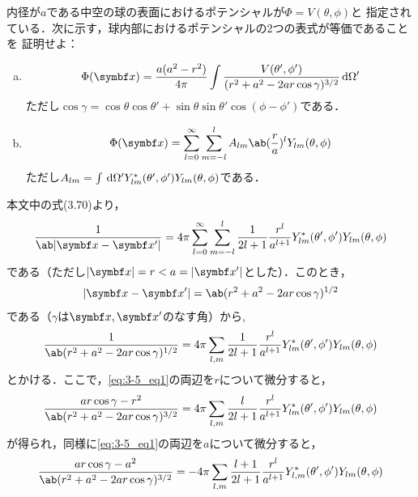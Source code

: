 \begin{bx1}
    内径が$a$である中空の球の表面におけるポテンシャルが$\Phi = V(\theta, \phi)$と
    指定されている．次に示す，球内部におけるポテンシャルの2つの表式が等価であることを
    証明せよ：
    \begin{enumerate}[(a)]%
      \item  
        \begin{gather}%
          \Phi(\bs{x}) = \frac{a(a^2 - r^2)}{4\pi} \int \frac{V(\theta',\phi')}{(r^2 + a^2 - 2ar\cos\gamma)^{3/2}}\dl{\Omega'}
        \end{gather}%
        ただし$\cos\gamma = \cos\theta\cos\theta'+\sin\theta\sin\theta'\cos(\phi-\phi')$である．
      \item
        \begin{gather}%
          \Phi(\bs{x}) = \sum_{l=0}^\infty \sum_{m=-l}^{l} A_{lm} \ab(\frac ra)^l Y_{lm}(\theta,\phi)
        \end{gather}%
        ただし$A_{lm} = \int \dl{\Omega'}Y^*_{lm}(\theta',\phi') Y_{lm}(\theta,\phi)$である．
    \end{enumerate}%
  \end{bx1}
  本文中の式(3.70)より，
  \begin{gather}%
    \frac{1}{\ab|\bs{x}-\bs{x}'|} = 4\pi \sum_{l=0}^\infty \sum_{m=-l}^l \frac{1}{2l+1}
    \frac{r^l}{a^{l+1}} Y^*_{lm}(\theta',\phi') Y_{lm}(\theta,\phi)
  \end{gather}%
  である（ただし$|\bs{x}| = r < a = |\bs{x}'|$とした）．このとき，
  \begin{gather*}%
    |\bs{x} - \bs{x}'| = \ab(r^2 + a^2 - 2ar\cos\gamma)^{1/2}
  \end{gather*}%
  である（$\gamma$は$\bs{x}, \bs{x}'$のなす角）から,
  \begin{gather}%
    \label{eq:3-5_eq1}
    \frac{1}{\ab(r^2 + a^2 - 2ar \cos\gamma)^{1/2}} = 4\pi\sum_{l,m} \frac{1}{2l+1}
    \frac{r^l}{a^{l+1}} Y^*_{lm}(\theta',\phi') Y_{lm}(\theta,\phi)
  \end{gather}%
  とかける．ここで，\eqref{eq:3-5_eq1}の両辺を$r$について微分すると，
  \begin{gather}%
    \label{eq:3-5_eq2}
    \frac{ar\cos\gamma - r^2}{\ab(r^2+a^2-2ar\cos\gamma)^{3/2}} = 4\pi \sum_{l,m}
    \frac{l}{2l+1} \frac{r^l}{a^{l+1}} Y^*_{lm}(\theta',\phi') Y_{lm}(\theta,\phi)
  \end{gather}%
  が得られ，同様に\eqref{eq:3-5_eq1}の両辺を$a$について微分すると，
  \begin{gather}%
    \label{eq:3-5_eq3}
    \frac{ar\cos\gamma - a^2}{\ab(r^2 + a^2 -2ar\cos\gamma)^{3/2}} = 
    -4\pi\sum_{l,m}\frac{l+1}{2l+1}\frac{r^l}{a^{l+1}}
    Y^*_{l,m}(\theta',\phi') Y_{lm}(\theta,\phi)
  \end{gather}%
